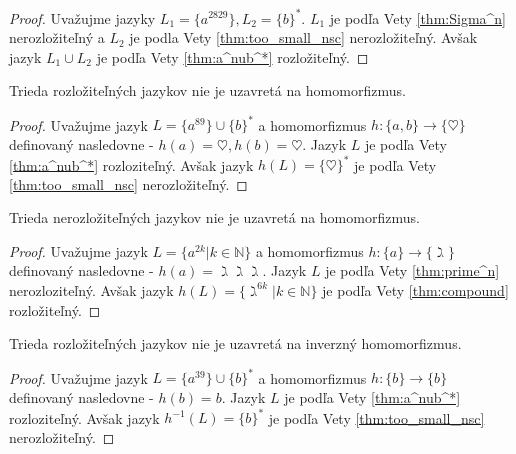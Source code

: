 \begin{proof}
Uvažujme jazyky $ L_1 = \lbrace a^{2829} \rbrace, L_2 = \lbrace b \rbrace^* $. $ L_1 $ je podľa Vety \ref{thm:Sigma^n} nerozložiteľný a $ L_2 $ je podla Vety \ref{thm:too_small_nsc} nerozložiteľný. Avšak jazyk $ L_1 \cup L_2 $ je podľa Vety \ref{thm:a^nub^*} rozložiteľný.
\end{proof}

\begin{theorem}
Trieda rozložiteľných jazykov nie je uzavretá na homomorfizmus.
\end{theorem}

\begin{proof}
Uvažujme jazyk $ L = \lbrace a^{89} \rbrace \cup \lbrace b \rbrace^* $ a homomorfizmus $ h : \lbrace a,b \rbrace \rightarrow \lbrace \heartsuit \rbrace $ definovaný nasledovne - $ h(a) = \heartsuit, h(b) = \heartsuit $. Jazyk $ L $ je podľa Vety \ref{thm:a^nub^*} rozloziteľný. Avšak jazyk $ h(L) = \lbrace \heartsuit \rbrace^*$ je podľa Vety \ref{thm:too_small_nsc} nerozložiteľný.
\end{proof}

\begin{theorem}
Trieda nerozložiteľných jazykov nie je uzavretá na homomorfizmus.
\end{theorem}

\begin{proof}
Uvažujme jazyk $ L = \lbrace a^{2k} | k \in \mathbb{N} \rbrace $ a homomorfizmus $ h : \lbrace a \rbrace \rightarrow \lbrace \gimel \rbrace $ definovaný nasledovne - $ h(a) = \gimel\gimel\gimel $. Jazyk $ L $ je podľa Vety \ref{thm:prime^n} nerozloziteľný. Avšak jazyk $ h(L) = \lbrace \gimel^{6k} | k \in \mathbb{N} \rbrace$ je podľa Vety \ref{thm:compound} rozložiteľný.
\end{proof}

\begin{theorem}
Trieda rozložiteľných jazykov nie je uzavretá na inverzný homomorfizmus.
\end{theorem}

\begin{proof}
Uvažujme jazyk $ L = \lbrace a^{39} \rbrace \cup \lbrace b \rbrace^* $ a homomorfizmus $ h : \lbrace b \rbrace \rightarrow \lbrace b \rbrace $ definovaný nasledovne - $ h(b) = b $. Jazyk $ L $ je podľa Vety \ref{thm:a^nub^*} rozloziteľný. Avšak jazyk $ h^{-1}(L) = \lbrace b \rbrace^*$ je podľa Vety \ref{thm:too_small_nsc} nerozložiteľný.
\end{proof}


